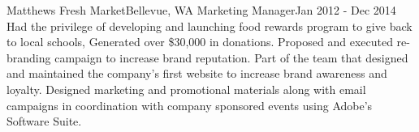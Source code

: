 \resumeSubheading
{Matthews Fresh Market}{Bellevue, WA}
{Marketing Manager}{Jan 2012 - Dec 2014}
    \resumeItemListStart
          {Had the privilege of developing and launching food rewards program to give back to local schools, Generated over \$30,000 in donations.}
          {Proposed and executed re-branding campaign to increase brand reputation.}
          {Part of the team that designed and maintained the company's first website to increase brand awareness and loyalty. Designed marketing and promotional materials along with email campaigns in coordination with company sponsored events using Adobe's Software Suite.}
    \resumeItemListEnd